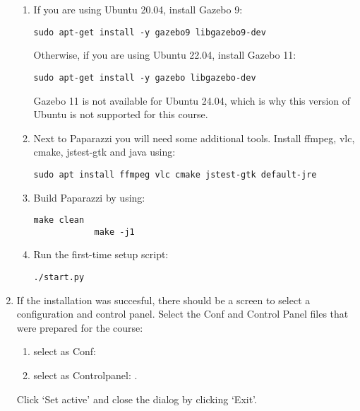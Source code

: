 \begin{enumerate}
\begin{enumerate}
		\item If you are using Ubuntu 20.04, install Gazebo 9:
		\begin{lstlisting}[style=Bash]
			sudo apt-get install -y gazebo9 libgazebo9-dev
		\end{lstlisting}

		Otherwise, if you are using Ubuntu 22.04, install Gazebo 11:
		\begin{lstlisting}[style=Bash]
			sudo apt-get install -y gazebo libgazebo-dev
		\end{lstlisting}
		Gazebo 11 is not available for Ubuntu 24.04, which is why this version of Ubuntu is not supported for this course.

		\item Next to Paparazzi you will need some additional tools. Install ffmpeg, vlc, cmake, jstest-gtk and java using:
		\begin{lstlisting}[style=Bash]
			sudo apt install ffmpeg vlc cmake jstest-gtk default-jre
		\end{lstlisting}

		\item Build Paparazzi by using:
		\begin{lstlisting}[style=Bash]
			make clean
			make -j1
		\end{lstlisting}

		\item Run the first-time setup script:
		\begin{lstlisting}[style=Bash]
			./start.py
		\end{lstlisting}
	\end{enumerate}
	
	\item If the installation was succesful, there should be a screen to select a configuration and control panel. Select the Conf and Control Panel files that were prepared for the course:
	\begin{enumerate}
	\item select as Conf: \\
	\item select as Controlpanel: .\\
	\end{enumerate}
	Click `Set active' and close the dialog by clicking `Exit'.
	

	

\end{enumerate}
